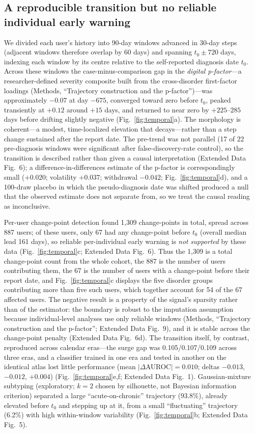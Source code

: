 \documentclass[11pt]{article}
\newcommand{\edfig}[1]{Extended Data Fig.~#1}
\begin{document}
\subsection*{A reproducible transition but no reliable individual early warning}
We divided each user's history into 90-day windows advanced in 30-day steps (adjacent windows
therefore overlap by 60 days) and spanning $t_0\pm720$ days, indexing each window by its centre
relative to the self-reported diagnosis date $t_0$. Across these windows the case-minus-comparison
gap in the \emph{digital p-factor}---a researcher-defined severity composite built from the
cross-disorder first-factor loadings (Methods, ``Trajectory construction and the p-factor'')---was
approximately $-0.07$ at day $-675$, converged toward zero before $t_0$, peaked
transiently at $+0.12$ around $+15$ days, and returned to near zero by $+225$--$285$ days before
drifting slightly negative (Fig.~\ref{fig:temporal}a). The morphology is coherent---a modest,
time-localized elevation that decays---rather than a step change sustained after the report date.
The pre-trend was not parallel (17 of 22 pre-diagnosis windows were significant after
false-discovery-rate control), so the transition is described rather than given a causal
interpretation (\edfig{6}); a difference-in-differences estimate of the p-factor is
correspondingly small ($+0.020$; volatility $+0.037$; withdrawal $-0.042$;
Fig.~\ref{fig:temporal}d), and a 100-draw placebo in which the pseudo-diagnosis date was shifted
produced a null that the observed estimate does not separate from, so we treat the causal reading
as inconclusive.

Per-user change-point detection found 1{,}309 change-points in total, spread across 887 users;
of these users, only 67 had any change-point before $t_0$ (overall median lead 161 days), so
reliable per-individual early warning is \emph{not supported} by these data
(Fig.~\ref{fig:temporal}c; \edfig{6}). Thus the 1,309 is a total change-point count from the
whole cohort, the 887 is the number of users contributing them, the 67 is the number of users
with a change-point before their report date, and Fig.~\ref{fig:temporal}c displays the five
disorder groups contributing more than five such users, which together account for 54 of the 67
affected users. The negative result is a property of the signal's sparsity rather than of the
estimator: the boundary is robust to the imputation assumption because individual-level
analyses use only reliable windows (Methods, ``Trajectory construction and the p-factor'';
\edfig{9}), and it is stable across the change-point penalty (\edfig{6}d). The transition
itself, by contrast, reproduced across calendar eras---the surge gap was 0.105/0.107/0.109
across three eras, and a classifier trained in one era and tested in another on the identical
atlas lost little performance (mean $|\Delta$AUROC$|=0.010$; deltas $-0.013$, $-0.012$,
$+0.004$) (Fig.~\ref{fig:temporal}e,f; \edfig{1}). Gaussian-mixture subtyping (exploratory;
$k=2$ chosen by silhouette, not Bayesian information criterion) separated a large
``acute-on-chronic'' trajectory (93.8\%), already elevated before $t_0$ and stepping up at it,
from a small ``fluctuating'' trajectory (6.2\%) with high within-window variability
(Fig.~\ref{fig:temporal}b; \edfig{5}).
\end{document}
